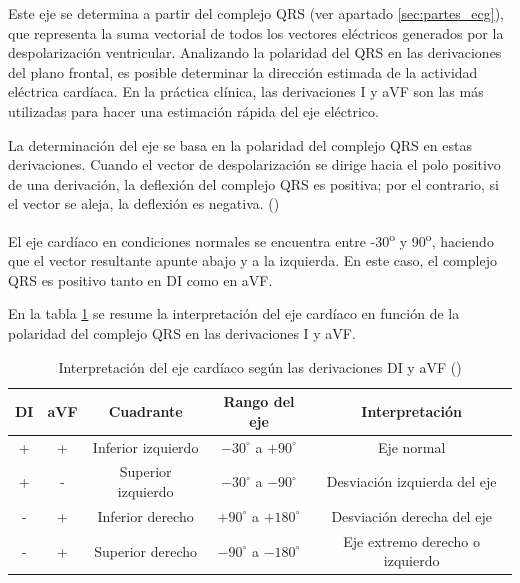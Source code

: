 \documentclass[12pt,a4paper,twoside]{book}
\begin{document}
\begin{itemize}
	Este eje se determina a partir del complejo QRS (ver apartado \ref{sec:partes_ecg}), que representa la suma vectorial de todos los vectores eléctricos generados por la despolarización ventricular. Analizando la polaridad del QRS en las derivaciones del plano frontal, es posible determinar la dirección estimada de la actividad eléctrica cardíaca.
	En la práctica clínica, las derivaciones I y aVF son las más utilizadas para hacer una estimación rápida del eje eléctrico. 

	La determinación del eje se basa en la polaridad del complejo QRS en estas derivaciones. Cuando el vector de despolarización se dirige hacia el polo positivo de una derivación, la deflexión del complejo QRS es positiva; por el contrario, si el vector se aleja, la deflexión es negativa. (\cite{cardioteca_eje_cardiaco})

	El eje cardíaco en condiciones normales se encuentra entre -30\textsuperscript{o} y 90\textsuperscript{o}, haciendo que el vector resultante apunte abajo y a la izquierda. En este caso, el complejo QRS es positivo tanto en DI como en aVF. 
	
	En la tabla \ref{tab:eje_cardiaco} se resume la interpretación del eje cardíaco en función de la polaridad del complejo QRS en las derivaciones I y aVF.


	\begin{table}[H]
	\centering
	\begin{tabular}{|c|c|c|c|c|}
	\hline
	\textbf{DI} & \textbf{aVF} & \textbf{Cuadrante} & \textbf{Rango del eje} & \textbf{Interpretación} \\ \hline

	+ & + & Inferior izquierdo & $-30^\circ$ a $+90^\circ$ & Eje normal \\ 

	+ & - & Superior izquierdo & $-30^\circ$ a $-90^\circ$ & Desviación izquierda del eje \\ 

	- & + & Inferior derecho & $+90^\circ$ a $+180^\circ$ & Desviación derecha del eje \\

	- & + & Superior derecho & $-90^\circ$ a $-180^\circ$ & Eje extremo derecho o izquierdo \\ \hline

	\end{tabular}
	\caption{Interpretación del eje cardíaco según las derivaciones DI y aVF (\cite{prutkin_ecg_uptodate})}
	\label{tab:eje_cardiaco}
	\end{table}


\end{itemize}
\end{document}
